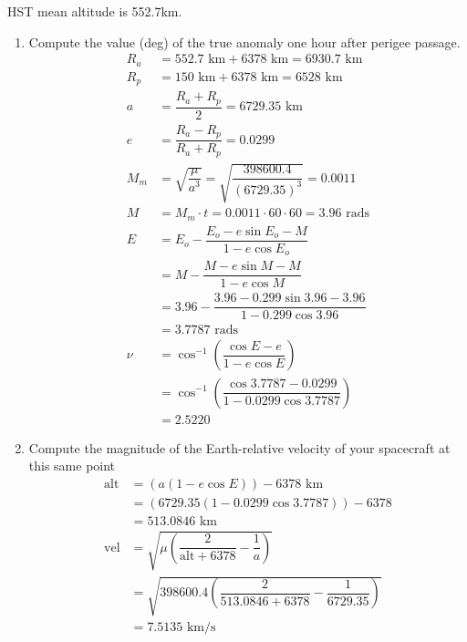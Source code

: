 \documentclass[onecolumn,10pt]{jhwhw}
\begin{document}
HST mean altitude is 552.7km.
\begin{enumerate}
\item Compute the value (deg) of the true anomaly one hour after perigee passage.
\begin{align*}
R_a &= 552.7 \mbox{ km} + 6378 \mbox{ km} = 6930.7 \mbox{ km}\\
R_p &= 150 \mbox{ km} + 6378 \mbox{ km} = 6528 \mbox{ km}\\
a &= \dfrac{R_a + R_p}{2} = 6729.35 \mbox{ km}\\
e &= \dfrac{R_a - R_p}{R_a + R_p} = 0.0299 \\
M_m &= \sqrt{\dfrac{\mu}{a^3}} = \sqrt{\dfrac{398600.4}{(6729.35)^3}} = 0.0011\\
M &= M_m \cdot t = 0.0011 \cdot 60 \cdot 60 = 3.96 \mbox{ rads}\\
E &= E_o - \dfrac{E_o - e \sin{E_o} - M}{1 - e \cos{E_o}} \\
  &= M - \dfrac{M - e \sin{M} - M}{1 - e \cos{M}} \\
  &= 3.96 - \dfrac{3.96 - 0.299 \sin{3.96} - 3.96}{1 - 0.299 \cos{3.96}} \\
  &= 3.7787 \mbox{ rads}\\
\nu &= \cos^{-1}\left({\dfrac{\cos{E} - e}{1 - e \cos{E}}}\right) \\
    &= \cos^{-1}\left({\dfrac{\cos{3.7787} - 0.0299}{1 - 0.0299 \cos{3.7787}}}\right) \\
    &= 2.5220
\end{align*}
\item Compute the magnitude of the Earth-relative velocity of your spacecraft at this same point
\begin{align*}
\mbox{alt} &= \left( a (1-e \cos{E}) \right) - 6378 \mbox{ km} \\
           &= \left( 6729.35 (1-0.0299 \cos{3.7787}) \right) - 6378 \\
           &= 513.0846 \mbox{ km}\\
\mbox{vel} &= \sqrt{\mu \left( \dfrac{2}{\mbox{alt} + 6378} - \dfrac{1}{a} \right)} \\
           &= \sqrt{398600.4 \left( \dfrac{2}{\mbox{513.0846} + 6378} - \dfrac{1}{6729.35} \right)} \\
           &= 7.5135 \mbox{ km/s}
\end{align*}
\end{enumerate}
\end{document}
